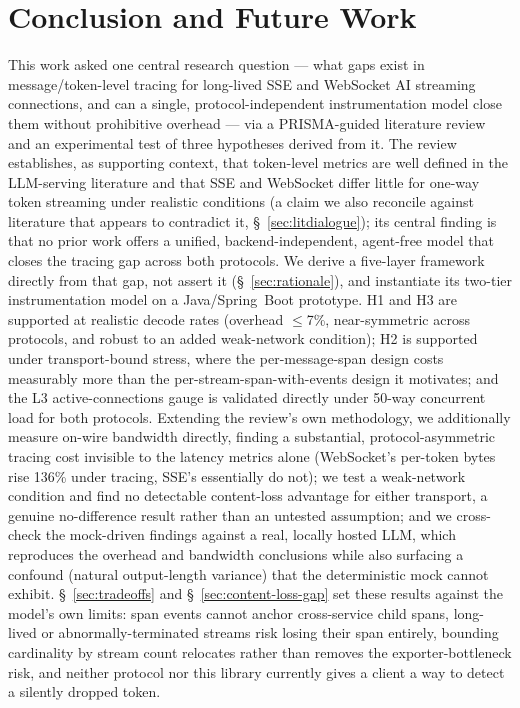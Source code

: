 \documentclass[11pt]{article}
\begin{document}
\section{Conclusion and Future Work}
This work asked one central research question --- what gaps exist in message/token-level tracing for long-lived SSE and WebSocket AI streaming connections, and can a single, protocol-independent instrumentation model close them without prohibitive overhead --- via a PRISMA-guided literature review and an experimental test of three hypotheses derived from it. The review establishes, as supporting context, that token-level metrics are well defined in the LLM-serving literature and that SSE and WebSocket differ little for one-way token streaming under realistic conditions (a claim we also reconcile against literature that appears to contradict it, \S~\ref{sec:litdialogue}); its central finding is that no prior work offers a unified, backend-independent, agent-free model that closes the tracing gap across both protocols. We derive a five-layer framework directly from that gap, not assert it (\S~\ref{sec:rationale}), and instantiate its two-tier instrumentation model on a Java/Spring~Boot prototype. H1 and H3 are supported at realistic decode rates (overhead $\le$7\%, near-symmetric across protocols, and robust to an added weak-network condition); H2 is supported under transport-bound stress, where the per-message-span design costs measurably more than the per-stream-span-with-events design it motivates; and the L3 active-connections gauge is validated directly under 50-way concurrent load for both protocols. Extending the review's own methodology, we additionally measure on-wire bandwidth directly, finding a substantial, protocol-asymmetric tracing cost invisible to the latency metrics alone (WebSocket's per-token bytes rise 136\% under tracing, SSE's essentially do not); we test a weak-network condition and find no detectable content-loss advantage for either transport, a genuine no-difference result rather than an untested assumption; and we cross-check the mock-driven findings against a real, locally hosted LLM, which reproduces the overhead and bandwidth conclusions while also surfacing a confound (natural output-length variance) that the deterministic mock cannot exhibit. \S~\ref{sec:tradeoffs} and \S~\ref{sec:content-loss-gap} set these results against the model's own limits: span events cannot anchor cross-service child spans, long-lived or abnormally-terminated streams risk losing their span entirely, bounding cardinality by stream count relocates rather than removes the exporter-bottleneck risk, and neither protocol nor this library currently gives a client a way to detect a silently dropped token.
\end{document}
